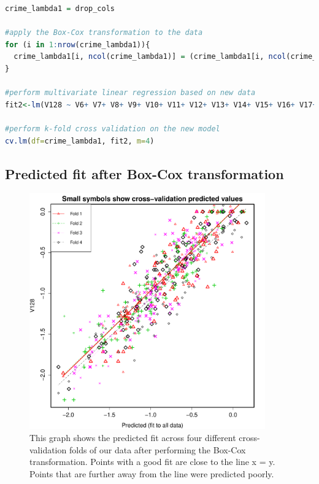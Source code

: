 \documentclass{article}
\begin{document}
\begin{lstlisting}[language=r]
crime_lambda1 = drop_cols

#apply the Box-Cox transformation to the data
for (i in 1:nrow(crime_lambda1)){
  crime_lambda1[i, ncol(crime_lambda1)] = (crime_lambda1[i, ncol(crime_lambda1)]^0.3-1)/0.3
}

#perform multivariate linear regression based on new data
fit2<-lm(V128 ~ V6+ V7+ V8+ V9+ V10+ V11+ V12+ V13+ V14+ V15+ V16+ V17+ V18+ V19+ V20+ V21+ V22+ V23+ V24+ V25+ V26+ V27+ V28+ V29+ V30+ V32+ V33+ V34+ V35+ V36+ V37+ V38+ V39+ V40+ V41+ V42+ V43+ V44+ V45+ V46+ V47+ V48+ V49+ V50+ V51+ V52+ V53+ V54+ V55+ V56+ V57+ V58+ V59+ V60+ V61+ V62+ V63+ V64+ V65+ V66+ V67+ V68+ V69+ V70+ V71+ V72+ V73+ V74+ V75+ V76+ V77+ V78+ V79+ V80+ V81+ V82+ V83+ V84+ V85+ V86+ V87+ V88+ V89+ V90+ V91+ V92+ V93+ V94+ V95+ V96+ V97+ V98+ V99+ V100+ V101+ V119+ V120+ V121+ V126, data=crime_lambda1)

#perform k-fold cross validation on the new model
cv.lm(df=crime_lambda1, fit2, m=4)
\end{lstlisting}

\subsection{Predicted fit after Box-Cox transformation}
\begin{figure}[H]
\centering
\includegraphics[width=4in]{part1b.pdf}
\caption{This graph shows the predicted fit across four different
cross-validation folds of our data after performing the Box-Cox transformation.
Points with a good fit are close to the line x = y. Points that are further away
from the line were predicted poorly.}
\end{figure}
\end{document}
